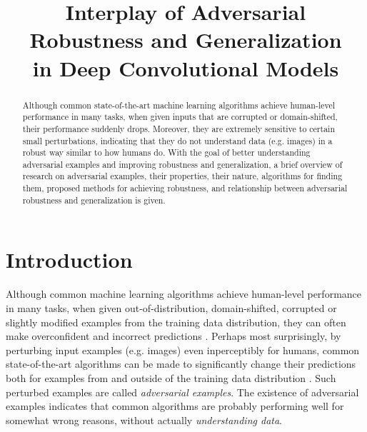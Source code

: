 \documentclass[conference,compsoc]{IEEEtran}
\begin{document}
\title{Interplay of Adversarial Robustness and Generalization\\ in Deep Convolutional Models}
\author{
}

\maketitle


\begin{abstract}
Although common state-of-the-art machine learning algorithms achieve human-level performance in many tasks, when given inputs that are corrupted or domain-shifted, their performance suddenly drops. Moreover, they are extremely sensitive to certain small perturbations, indicating that they do not understand data (e.g. images) in a robust way similar to how humans do. With the goal of better understanding adversarial examples and improving robustness and generalization, a brief overview of research on adversarial examples, their properties, their nature, algorithms for finding them, proposed methods for achieving robustness, and relationship between adversarial robustness and generalization is given.
\end{abstract}

\section{Introduction}

Although common machine learning algorithms achieve human-level performance in many tasks, when given out-of-distribution, domain-shifted, corrupted or slightly modified examples from the training data distribution, they can often make overconfident and incorrect predictions \citep{Hendrycks:2016:BDMOODE,Ganin:2015:UDAB,Nguyen:2015:DNNEFHCPUI,Hendrycks:2019:BNNRCCP,Engstrom:2017:RTSFCST,Szegedy:2013:IPNN}. Perhaps most surprisingly, by perturbing input examples (e.g. images) even inperceptibly for humans, common state-of-the-art algorithms can be made to significantly change their predictions both for examples from and outside of the training data distribution \citep{Szegedy:2013:IPNN, Goodfellow:2014:EHAE}. Such perturbed examples are called \textit{adversarial examples}. The existence of adversarial examples indicates that common algorithms are probably performing well for somewhat wrong reasons, without actually \textit{understanding data}.
\end{document}

